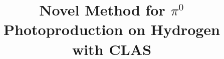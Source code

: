 \documentclass[aps,prc,twocolumn,floatfix,showpacs,preprintnumbers,amsmath,amssymb,superscriptaddress,linenumbers]{revtex4-1}
\def\epemT{$ e^+e^-  $}
\begin{document}
\preprint{}

\title{Novel Method for $\pi^0$ Photoproduction on Hydrogen with CLAS}

\newcommand*{\ODU}{Old Dominion University, Norfolk, VA 23529, USA}
\newcommand*{\IKP}{Institut f\"ur Kernphysik, Forschungszentrum J\"ulich, 
	52424 J\"ulich, Germany}
\newcommand*{\BOCHUM}{Institut f\"ur Experimentalphysik I, Ruhr-–Universit\"at 
	Bochum, 44780 Bochum, Germany}
\newcommand*{\JARA}{ JARA–FAME, J\"ulich Aachen Research Alliance, 
	Forschungszentrum J\"ulich, 52425 J\"ulich, and RWTH Aachen, 52056 
	Aachen, Germany}
\newcommand*{\KYUNGPOOK} {Kyungpook National University, 702-701, Daegu, 
	Republic of Korea}
\newcommand*{\INR}{Institute for Nuclear Research, 117312, Moscow, Russia}
\newcommand*{\CUA}{Catholic University of America, Washington, DC 20064} 
\newcommand*{\JLAB}{Thomas Jefferson National Accelerator Facility, Newport 
	News, VA 23606}
\newcommand*{\UVA}{University of Virginia, Charlottesville, VA 22904, USA}
\newcommand*{\CMU}{Carnegie Mellon University, Pittsburg, PA 15213, USA}
\end{document}
